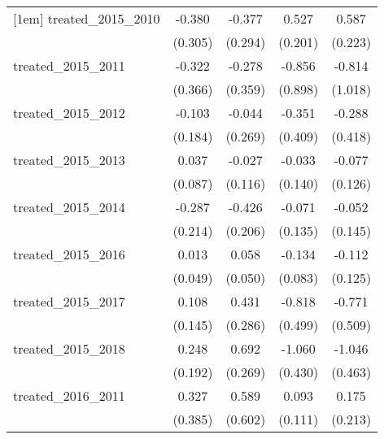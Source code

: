 {\begin{tabular}{l*{4}{c}}
[1em]
treated\_2015\_2010&      -0.380         &      -0.377         &       0.527\sym{**} &       0.587\sym{**} \\
            &     (0.305)         &     (0.294)         &     (0.201)         &     (0.223)         \\
[1em]
treated\_2015\_2011&      -0.322         &      -0.278         &      -0.856         &      -0.814         \\
            &     (0.366)         &     (0.359)         &     (0.898)         &     (1.018)         \\
[1em]
treated\_2015\_2012&      -0.103         &      -0.044         &      -0.351         &      -0.288         \\
            &     (0.184)         &     (0.269)         &     (0.409)         &     (0.418)         \\
[1em]
treated\_2015\_2013&       0.037         &      -0.027         &      -0.033         &      -0.077         \\
            &     (0.087)         &     (0.116)         &     (0.140)         &     (0.126)         \\
[1em]
treated\_2015\_2014&      -0.287         &      -0.426\sym{*}  &      -0.071         &      -0.052         \\
            &     (0.214)         &     (0.206)         &     (0.135)         &     (0.145)         \\
[1em]
treated\_2015\_2016&       0.013         &       0.058         &      -0.134         &      -0.112         \\
            &     (0.049)         &     (0.050)         &     (0.083)         &     (0.125)         \\
[1em]
treated\_2015\_2017&       0.108         &       0.431         &      -0.818         &      -0.771         \\
            &     (0.145)         &     (0.286)         &     (0.499)         &     (0.509)         \\
[1em]
treated\_2015\_2018&       0.248         &       0.692\sym{*}  &      -1.060\sym{*}  &      -1.046\sym{*}  \\
            &     (0.192)         &     (0.269)         &     (0.430)         &     (0.463)         \\
[1em]
treated\_2016\_2011&       0.327         &       0.589         &       0.093         &       0.175         \\
            &     (0.385)         &     (0.602)         &     (0.111)         &     (0.213)         \\

\end{tabular}}
